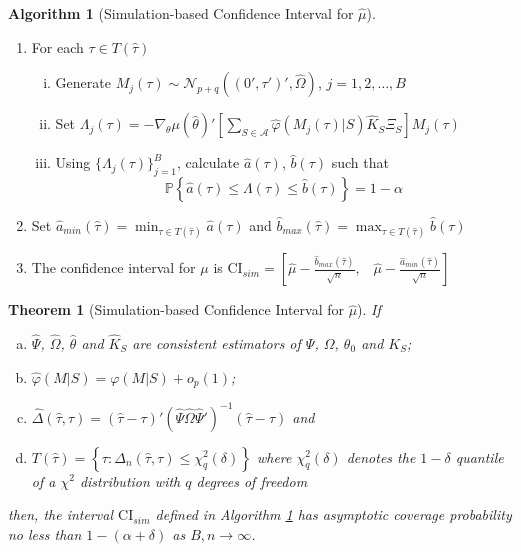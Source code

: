 \documentclass[12pt]{article}
\newcommand{\p}{\mathbb{P}}
\newtheorem{thm}{Theorem}[section]
\theoremstyle{definition}
\newtheorem{alg}{Algorithm}[section]
\begin{document}
\begin{alg}[Simulation-based Confidence Interval for $\widehat{\mu}$]
\label{alg:conf}
\mbox{}
\begin{enumerate}
	\item For each $\tau \in T(\widehat{\tau})$ 
		\begin{enumerate}[(i)]
			\item Generate $M_j(\tau) \sim \mathcal{N}_{p+q}\left( (0', \tau')', \widehat{\Omega}  \right)$, $j = 1, 2, \hdots, B$ 
			\item Set $\Lambda_j(\tau) = -\nabla_\theta\mu(\widehat{\theta})'\left[\sum_{S \in \mathcal{A}} \widehat{\varphi}(M_j(\tau)|S) \widehat{K}_S\Xi_S\right] M_j(\tau)$
			\item Using $\{\Lambda_j(\tau)\}_{j=1}^B$, calculate $\widehat{a}(\tau)$, $\widehat{b}(\tau)$ such that
		$$\p\left\{ \widehat{a}(\tau) \leq\Lambda(\tau)\leq \widehat{b}(\tau) \right\} = 1 - \alpha$$
		\end{enumerate}
	\item Set $\displaystyle \widehat{a}_{min}(\widehat{\tau})=\min_{\tau \in T(\widehat{\tau})} \widehat{a}(\tau)$ and $\displaystyle \widehat{b}_{max}(\widehat{\tau})= \max_{\tau \in T(\widehat{\tau})} \widehat{b}(\tau)$ \vspace{0.5em}
	\item The confidence interval for $\mu$ is
				$\displaystyle \mbox{CI}_{sim}=\left[ \widehat{\mu} - \frac{\widehat{b}_{max}(\widehat{\tau})}{\sqrt{n}}, \;\;\; \widehat{\mu} - \frac{\widehat{a}_{min}(\widehat{\tau})}{\sqrt{n}} \right]$
\end{enumerate}
\end{alg}

\begin{thm}[Simulation-based Confidence Interval for $\widehat{\mu}$]
\label{pro:sim}
If
\begin{enumerate}[(a)]
	\item $\widehat{\Psi}$, $\widehat{\Omega}$, $\widehat{\theta}$ and $\widehat{K}_S$ are consistent estimators of $\Psi$, $\Omega$, $\theta_0$ and $K_S$;
	\item $\widehat{\varphi}(M|S) = \varphi(M|S)+ o_p(1)$;
	\item $\widehat{\Delta}(\widehat{\tau},\tau) = \left(\widehat{\tau} - \tau\right)' \left(\widehat{\Psi}\widehat{\Omega}\widehat{\Psi}'\right)^{-1} \left(\widehat{\tau} - \tau\right)$ and
	\item $T(\widehat{\tau}) = \left\{\tau \colon  \Delta_n(\widehat{\tau},\tau) \leq \chi^2_q(\delta)\right\}$ where $\chi^2_q(\delta)$ denotes the $1-\delta$ quantile of a $\chi^2$ distribution with $q$ degrees of freedom
\end{enumerate}
then, the interval $\mbox{CI}_{sim}$ defined in Algorithm \ref{alg:conf} has asymptotic coverage probability no less than $1-(\alpha + \delta)$ as $B,n\rightarrow \infty$.
\end{thm}
\end{document}
